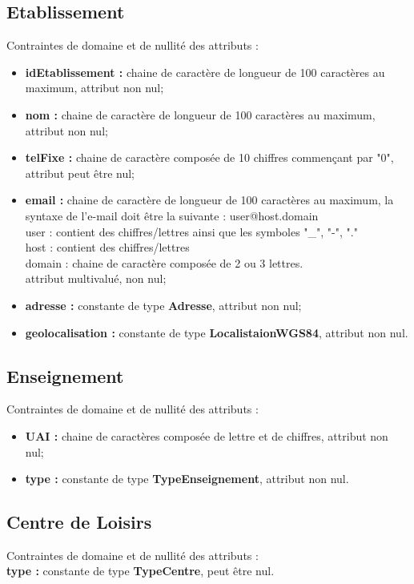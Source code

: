 \documentclass[asi, sansVersion]{picInsa}
\begin{document}
\subsection*{Etablissement}
Contraintes de domaine et de nullité des attributs :
\begin{itemize}
 	\item \textbf{idEtablissement :} chaine de caractère de longueur de 100 caractères au maximum, attribut non nul;
	\item \textbf{nom :} chaine de caractère de longueur de 100 caractères au maximum, attribut non nul;
	\item \textbf{telFixe :} chaine de caractère composée de 10 chiffres commençant par "0", attribut peut être nul;
	\item \textbf{email :} chaine de caractère de longueur de 100 caractères au maximum, la syntaxe de l'e-mail doit être la suivante : user@host.domain\\
	user : contient des chiffres/lettres ainsi que les symboles "\_", "-", "." \\
	host : contient des chiffres/lettres \\
	domain : chaine de caractère composée de 2 ou 3 lettres. \\
	attribut multivalué, non nul; 
	\item \textbf{adresse :} constante de type \textbf{Adresse}, attribut non nul; 
	\item \textbf{geolocalisation :} constante de type \textbf{LocalistaionWGS84}, attribut non nul.\\
\end{itemize}  

\subsection*{Enseignement}
Contraintes de domaine et de nullité des attributs :
\begin{itemize}
	\item \textbf{UAI :} chaine de caractères composée de lettre et de chiffres, attribut non nul;
	\item \textbf{type :} constante de type \textbf{TypeEnseignement}, attribut non nul.\\
\end{itemize}

\subsection*{Centre de Loisirs}
Contraintes de domaine et de nullité des attributs :\\
\indent \indent \textbf{type :} constante de type \textbf{TypeCentre}, peut être nul.\\
\end{document}
